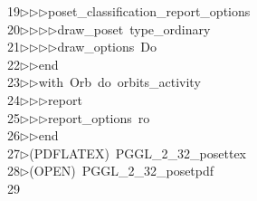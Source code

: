 \begin{tabbing}
19\>$\triangleright$\>$\triangleright$\>$\triangleright$\>poset\_classification\_report\_options\ \\[0pt]
20\>$\triangleright$\>$\triangleright$\>$\triangleright$\>$\triangleright$\>draw\_poset\ type\_ordinary\ \\[0pt]
21\>$\triangleright$\>$\triangleright$\>$\triangleright$\>$\triangleright$\>draw\_options\ Do\ \\[0pt]
22\>$\triangleright$\>$\triangleright$\>end\ \\[0pt]
23\>$\triangleright$\>$\triangleright$\>with\ Orb\ do\ orbits\_activity\ \\[0pt]
24\>$\triangleright$\>$\triangleright$\>$\triangleright$\>report\ \ \\[0pt]
25\>$\triangleright$\>$\triangleright$\>$\triangleright$\>report\_options\ ro\ \\[0pt]
26\>$\triangleright$\>$\triangleright$\>end\ \\[0pt]
27\>$\triangleright$\>(PDFLATEX)\ PGGL\_2\_32\_posettex\\[0pt]
28\>$\triangleright$\>(OPEN)\ PGGL\_2\_32\_posetpdf\\[0pt]
29\>\end{tabbing}
